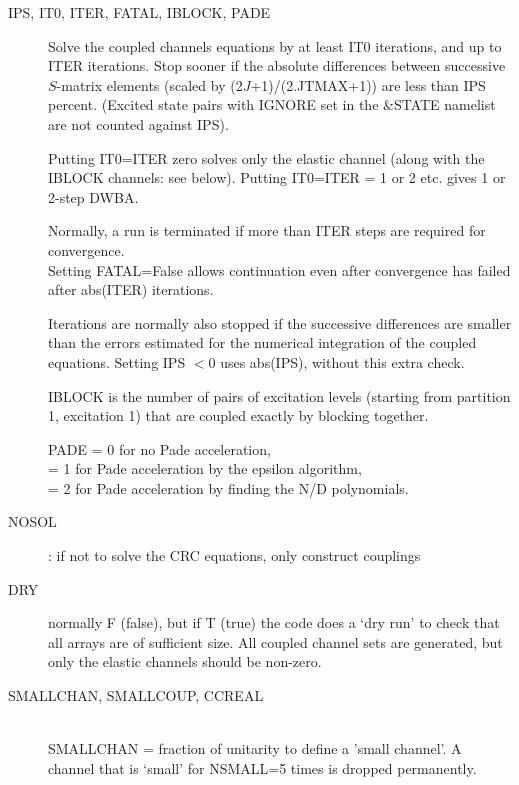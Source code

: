 \documentclass[11pt]{article}
\begin{document}
\begin{description}
\item[IPS, IT0, ITER, FATAL, IBLOCK, PADE]

Solve the coupled channels equations by at least IT0 iterations, and
up to ITER iterations.
Stop sooner if the absolute differences between successive $S$-matrix
elements (scaled by (2$J$+1)/(2.JTMAX+1)) are less than IPS percent.
(Excited state pairs with IGNORE set in the \&STATE namelist are not counted against IPS).

Putting IT0=ITER zero solves only the elastic channel (along with the
IBLOCK channels: see below).
Putting IT0=ITER = 1 or 2 etc. gives 1 or 2-step DWBA.

Normally, a run is terminated if more than ITER steps are required for
convergence. \\
Setting FATAL=False allows continuation even after
convergence has failed after abs(ITER) iterations.

Iterations are normally also stopped if the successive differences are smaller
than the errors estimated for the numerical integration of the coupled
equations. Setting IPS $< 0$ uses abs(IPS), without this extra check.

IBLOCK is the number of pairs of excitation levels
(starting from partition 1, excitation 1) that are coupled exactly by
blocking together.

PADE
 = 0 for no Pade acceleration,
\\ = 1 for Pade acceleration by the epsilon algorithm,
\\ = 2 for Pade acceleration by finding the N/D polynomials.

\item[NOSOL] : if not to solve the CRC equations, only construct couplings

\item[DRY]
normally F (false), but if T (true) the code does a `dry run'
to check that all arrays are of sufficient size.
All coupled channel sets are generated, but only the elastic
channels should be non-zero.

 \item[SMALLCHAN, SMALLCOUP, CCREAL] ~\\
%
SMALLCHAN = fraction of unitarity to define a 'small channel'. 
A channel that is `small' for NSMALL=5 times is dropped permanently.


\end{description}
\end{document}

